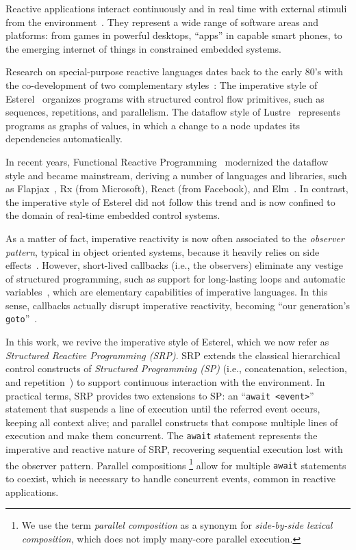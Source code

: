 \documentclass{acm_proc_article-sp}
\newcommand{\code}[1] {{\small{\texttt{#1}}}}
\newcommand{\1}{\;}
\newcommand{\2}{\;\;}
\newcommand{\3}{\;\;\;}
\newcommand{\5}{\;\;\;\;\;}
\begin{document}
Reactive applications interact continuously and in real time with external 
stimuli from the environment~\cite{statecharts.reactive,rp.synchronous}.
They represent a wide range of software areas and platforms: from games in 
powerful desktops, ``apps'' in capable smart phones, to the emerging internet 
of things in constrained embedded systems.

Research on special-purpose reactive languages dates back to the early 80's 
with the co-development of two complementary 
styles~\cite{rp.twelve,rp.hypothesis}:
%
The imperative style of Esterel~\cite{esterel.ieee91} organizes programs with 
structured control flow primitives, such as sequences, repetitions, and 
parallelism.
%
The dataflow style of Lustre~\cite{lustre.ieee91} represents programs as graphs 
of values, in which a change to a node updates its dependencies automatically.

In recent years, Functional Reactive Programming~\cite{frp.principles} 
modernized the dataflow style and became mainstream, deriving a number of 
languages and libraries, such as Flapjax~\cite{frp.flapjax}, Rx (from 
Microsoft), React (from Facebook), and Elm~\cite{frp.elm}.
%
In contrast, the imperative style of Esterel did not follow this trend and is 
now confined to the domain of real-time embedded control systems.

As a matter of fact, imperative reactivity is now often associated to the 
\emph{observer pattern}, typical in object oriented systems, because it heavily 
relies on side effects~\cite{rp.deprecating,rp.rescala}.
%
However, short-lived callbacks (i.e., the observers) eliminate any vestige of 
structured programming, such as support for long-lasting loops and automatic 
variables~\cite{sync_async.cooperative}, which are elementary capabilities of 
imperative languages.
%
In this sense, callbacks actually disrupt imperative reactivity, becoming ``our 
generation's \code{goto}''~\cite{dij.goto,rp.goto,elm.goto}.

In this work, we revive the imperative style of Esterel, which we now refer as 
\emph{Structured Reactive Programming (SRP)}.
%
SRP extends the classical hierarchical control constructs of \emph{Structured 
Programming (SP)} (i.e., concatenation, selection, and 
repetition~\cite{dij.notes}) to support continuous interaction with the 
environment.
%
In practical terms, SRP provides two extensions to SP:
an ``\code{await <event>}'' statement that suspends a line of execution until 
the referred event occurs, keeping all context alive;
and parallel constructs that compose multiple lines of execution and make them 
concurrent.
%
The \code{await} statement represents the imperative and reactive nature of 
SRP, recovering sequential execution lost with the observer pattern.
Parallel compositions%
\footnote{
We use the term \emph{parallel composition} as a synonym for \emph{side-by-side 
lexical composition}, which does not imply many-core parallel execution.
}
allow for multiple \code{await} statements to coexist, which is necessary to 
handle concurrent events, common in reactive applications.
\end{document}
